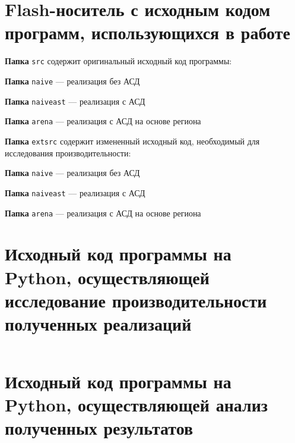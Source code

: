\section{Flash-носитель с исходным кодом программ, использующихся в работе}
\noindent \textbf{Папка} \verb|src| содержит оригинальный исходный код
программы:

\textbf{Папка} \verb|naive| — реализация без АСД

\textbf{Папка} \verb|naiveast| — реализация с АСД

\textbf{Папка} \verb|arena| — реализация с АСД на основе региона

\noindent \textbf{Папка} \verb|extsrc| содержит измененный исходный код,
необходимый для исследования производительности:

\textbf{Папка} \verb|naive| — реализация без АСД

\textbf{Папка} \verb|naiveast| — реализация с АСД

\textbf{Папка} \verb|arena| — реализация с АСД на основе региона


\section{Исходный код программы на Python, осуществляющей исследование 
производительности полученных реализаций}

\inputminted{python}{test.py}

\section{Исходный код программы на Python, осуществляющей анализ полученных
результатов}

\inputminted{python}{graph.py}